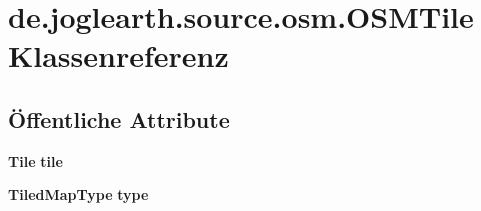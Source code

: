 \section{de.\-joglearth.\-source.\-osm.\-O\-S\-M\-Tile Klassenreferenz}
\label{classde_1_1joglearth_1_1source_1_1osm_1_1_o_s_m_tile}
\subsection*{Öffentliche Attribute}
\begin{DoxyCompactItemize}
\item 
{\bf Tile} {\bfseries tile}\label{classde_1_1joglearth_1_1source_1_1osm_1_1_o_s_m_tile_a1397a0f96b9d8f5e60c3a5edab46b2f3}

\item 
{\bf Tiled\-Map\-Type} {\bfseries type}\label{classde_1_1joglearth_1_1source_1_1osm_1_1_o_s_m_tile_a90c20737534ceb4ccc2438d6fe3d96dd}

\end{DoxyCompactItemize}
